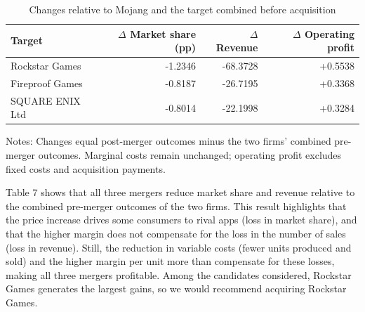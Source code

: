 \documentclass{article}
\begin{document}
\begin{table}[htbp]
\centering
\caption{Changes relative to Mojang and the target combined
before acquisition}
\label{tab:merger-changes}
\begin{tabular}{lrrr}
\toprule
Target & $\Delta$ Market share (pp) & $\Delta$ Revenue
       & $\Delta$ Operating profit \\
\midrule
Rockstar Games  & -1.2346 & -68.3728 & +0.5538 \\
Fireproof Games & -0.8187 & -26.7195 & +0.3368 \\
SQUARE ENIX Ltd & -0.8014 & -22.1998 & +0.3284 \\
\bottomrule
\end{tabular}

\smallskip
\begin{minipage}{0.95\textwidth}
\footnotesize
Notes: Changes equal post-merger outcomes minus the two firms' combined pre-merger outcomes. Marginal costs remain unchanged; operating profit excludes fixed costs and acquisition payments.
\end{minipage}
\end{table}

Table 7 shows that all three mergers reduce market share and revenue relative to the combined pre-merger outcomes of the two firms. This result highlights that the price increase drives some consumers to rival apps (loss in market share), and that the higher margin does not compensate for the loss in the number of sales (loss in revenue). Still, the reduction in variable costs (fewer units produced and sold) and the higher margin per unit more than compensate for these losses, making all three mergers profitable. Among the candidates considered, Rockstar Games generates the largest gains, so we would recommend acquiring Rockstar Games.

\appendix
\clearpage
\begingroup
{}
\titleformat{\section}{\large\bfseries\color{ink}}{\thesection}{0.65em}{}
\titlespacing*{\section}{0pt}{12pt}{6pt}
\setlength{\parindent}{0pt}
\setlength{\parskip}{5pt}
\setlength{\abovedisplayskip}{8pt}
\setlength{\belowdisplayskip}{8pt}
\pagestyle{fancy}
\fancyhf{}
\fancyfoot[C]{\small\color{muted}\thepage}
\renewcommand{\headrulewidth}{0.3pt}
\setlength{\headheight}{14pt}
\newcommand{\ddp}[1]{\frac{\partial #1}{\partial p_j}}
\end{document}
